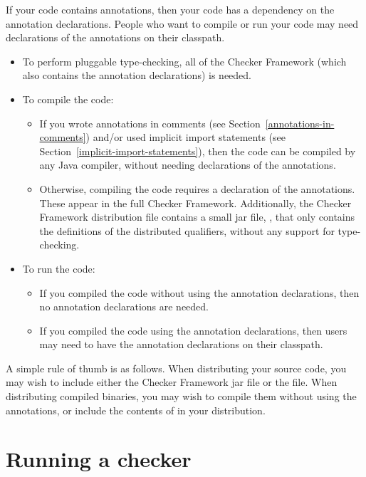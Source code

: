If your code contains annotations, then your code has a dependency on the
annotation declarations.  People who want to compile or run your code may
need declarations of the annotations on their classpath.

\begin{itemize}
\item
To perform pluggable type-checking, all of the Checker Framework (which
also contains the annotation declarations) is needed.
\item
To compile the code:
\begin{itemize}
\item
  If you wrote annotations in comments (see
  Section~\ref{annotations-in-comments}) and/or used implicit import
  statements (see Section~\ref{implicit-import-statements}), then the code
  can be compiled by any Java compiler, without needing declarations of the
  annotations.
\item
  Otherwise, compiling the code requires a declaration of the annotations.
  These appear in the full Checker Framework.  Additionally, the Checker
  Framework distribution  file contains a small jar file,
  , that only contains the definitions of the
  distributed qualifiers, without any support for type-checking.
\end{itemize}
\item
To run the code:
\begin{itemize}
\item
  If you compiled the code without using the annotation declarations, then
  no annotation declarations are needed.
\item
  If you compiled the code using the annotation declarations, then users
  may need to have the annotation declarations on their classpath.
\end{itemize}
\end{itemize}

A simple rule of thumb is as follows.  When distributing your source code,
you may wish to include either the Checker Framework jar file or the
 file.  When distributing compiled binaries, you
may wish to compile them without using the annotations, or include the
contents of  in your distribution.


\section{Running a checker\label{running}}

